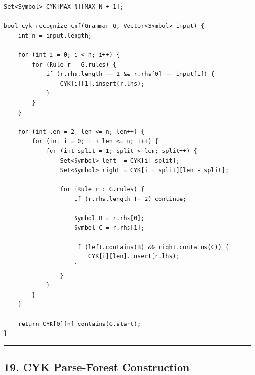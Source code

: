 \documentclass[10pt,letterpaper]{article}
\begin{document}
\begin{verbatim}
Set<Symbol> CYK[MAX_N][MAX_N + 1];

bool cyk_recognize_cnf(Grammar G, Vector<Symbol> input) {
    int n = input.length;

    for (int i = 0; i < n; i++) {
        for (Rule r : G.rules) {
            if (r.rhs.length == 1 && r.rhs[0] == input[i]) {
                CYK[i][1].insert(r.lhs);
            }
        }
    }

    for (int len = 2; len <= n; len++) {
        for (int i = 0; i + len <= n; i++) {
            for (int split = 1; split < len; split++) {
                Set<Symbol> left  = CYK[i][split];
                Set<Symbol> right = CYK[i + split][len - split];

                for (Rule r : G.rules) {
                    if (r.rhs.length != 2) continue;

                    Symbol B = r.rhs[0];
                    Symbol C = r.rhs[1];

                    if (left.contains(B) && right.contains(C)) {
                        CYK[i][len].insert(r.lhs);
                    }
                }
            }
        }
    }

    return CYK[0][n].contains(G.start);
}
\end{verbatim}

\medskip\hrule\medskip

\subsection*{19. CYK Parse-Forest Construction}
\end{document}
